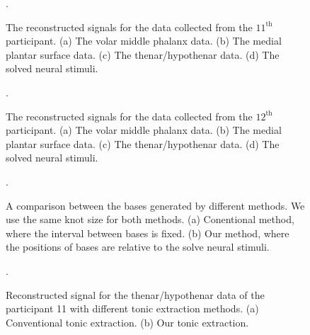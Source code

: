 \documentclass[10pt,conference]{ieeeconf}
\begin{document}
\begin{figure}[!tb]
  \centering
  \DeclareGraphicsExtensions.
  \caption{The reconstructed signals for the data collected from the $11^{\mathrm{th}}$ participant. (a) The volar middle phalanx data. (b) The medial plantar surface data. (c) The thenar/hypothenar data. (d) The solved neural stimuli.} \label{fig:results}
\end{figure}

\begin{figure}[!tb]
  \centering
  \DeclareGraphicsExtensions.
  \caption{The reconstructed signals for the data collected from the $12^{\mathrm{th}}$ participant. (a) The volar middle phalanx data. (b) The medial plantar surface data. (c) The thenar/hypothenar data. (d) The solved neural stimuli.} \label{fig:12results}
\end{figure}

\begin{figure*}[!tb]
  \centering
  \DeclareGraphicsExtensions.
  \caption{A comparison between the bases generated by different methods. We use the same knot size for both methods. (a) Conentional method, where the interval between bases is fixed. (b) Our method, where the positions of bases are relative to the solve neural stimuli.} \label{fig:bases}
\end{figure*}

\begin{figure*}[!tb]
  \centering
  \DeclareGraphicsExtensions.
  \caption{Reconstructed signal for the thenar/hypothenar data of the participant 11 with different tonic extraction methods. (a) Conventional tonic extraction. (b) Our tonic extraction.} \label{fig:comptonic}
\end{figure*}
\end{document}
